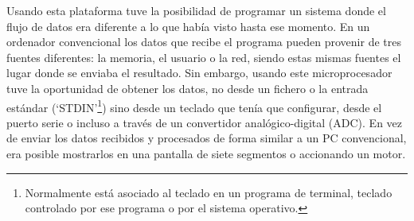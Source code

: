 Usando esta plataforma tuve la posibilidad de programar un sistema donde el flujo de datos era diferente a lo que había visto hasta ese momento.  En un ordenador convencional los datos que recibe el programa pueden provenir de tres fuentes diferentes: la memoria, el usuario o la red, siendo estas mismas fuentes el lugar donde se enviaba el resultado.  Sin embargo, usando este microprocesador tuve la oportunidad de obtener los datos, no desde un fichero o la entrada estándar (`STDIN'\footnote{Normalmente está asociado al teclado en un programa de terminal, teclado controlado por ese programa o por el sistema operativo.}) sino desde un teclado que tenía que configurar, desde el puerto serie o incluso a través de un convertidor analógico-digital (ADC).  En vez de enviar los datos recibidos y procesados de forma similar a un PC convencional, era posible mostrarlos en una pantalla de siete segmentos o accionando un motor.
 
